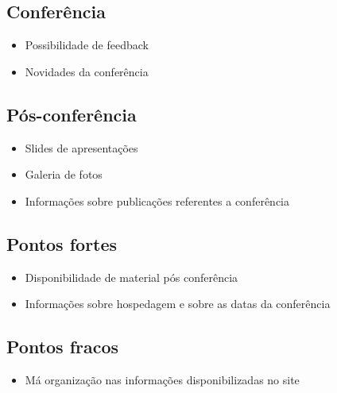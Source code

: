\documentclass[letter]{article}
\begin{document}
\subsection{Conferência}
\begin{itemize}
\item Possibilidade de feedback
\item Novidades da conferência
\end{itemize}

\subsection{Pós-conferência}
\begin{itemize} 
\item Slides de apresentações
\item Galeria de fotos
\item Informações sobre publicações referentes a conferência
  
\end{itemize}

\subsection{Pontos fortes}
\begin{itemize}
\item Disponibilidade de material pós conferência
\item Informações sobre hospedagem e sobre as datas da conferência
\end{itemize}

\subsection{Pontos fracos}
\begin{itemize}
\item Má organização nas informações disponibilizadas no site
\end{itemize}
\end{document}

